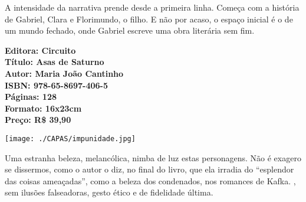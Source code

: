 \hspace*{-7cm}\hrulefill\hspace*{-7cm}

\medskip

\noindent{}A intensidade da narrativa prende desde a primeira linha.  Começa com a história de Gabriel, Clara e Florimundo, o filho. E não por acaso, o espaço inicial é o de um mundo fechado, onde Gabriel escreve uma obra literária sem fim.

\vfill

\hspace*{-.4cm}\begin{minipage}[c]{1\linewidth}
\small\textbf{
\hspace*{-.1cm}Editora: Circuito\\
Título: Asas de Saturno\\
Autor: Maria João Cantinho\\ 
ISBN: 978-65-8697-406-5\\
Páginas: 128\\
Formato: 16x23cm\\
Preço: R\$ 39,90\\
}
\end{minipage}

\pagebreak %

\begin{center}
\hspace*{-3.6cm}
\hspace*{3.1cm}\texttt{[image: ./CAPAS/impunidade.jpg]}
\end{center}

\hspace*{-7cm}\hrulefill\hspace*{-7cm}

\medskip

\noindent{}Uma estranha beleza, melancólica, nimba de luz estas personagens. Não é exagero se dissermos, como o autor o diz, no final do livro, que ela irradia do “esplendor das coisas ameaçadas”, como a beleza dos condenados, nos romances de Kafka. , sem ilusões falseadoras, gesto ético e de fidelidade última.

\vfill


